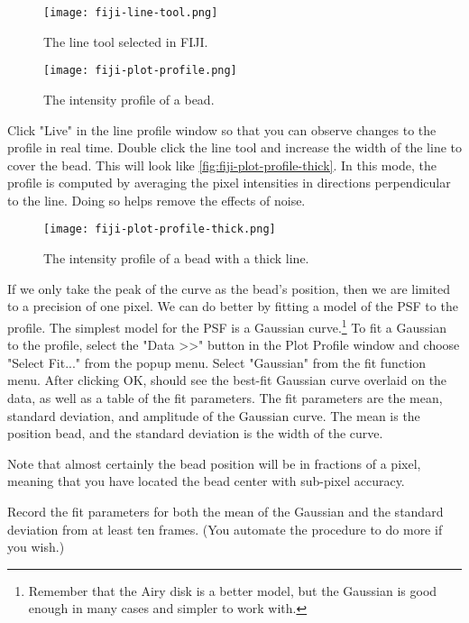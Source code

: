 \documentclass[10pt,a4paper,oneside]{book}
\begin{document}
\begin{figure}[ht]
    \centering
    \texttt{[image: fiji-line-tool.png]}
    \caption{The line tool selected in FIJI.}
    \label{fig:fiji-line-tool}
\end{figure}

\begin{figure}[ht]
    \centering
    \texttt{[image: fiji-plot-profile.png]}
    \caption{The intensity profile of a bead.}
    \label{fig:fiji-plot-profile}
\end{figure}

Click "Live" in the line profile window so that you can observe changes to the profile in real time. Double click the line tool and increase the width of the line to cover the bead. This will look like \autoref{fig:fiji-plot-profile-thick}. In this mode, the profile is computed by averaging the pixel intensities in directions perpendicular to the line. Doing so helps remove the effects of noise.

\begin{figure}[ht]
    \centering
    \texttt{[image: fiji-plot-profile-thick.png]}
    \caption{The intensity profile of a bead with a thick line.}
    \label{fig:fiji-plot-profile-thick}
\end{figure}

If we only take the peak of the curve as the bead's position, then we are limited to a precision of one pixel. We can do better by fitting a model of the PSF to the profile. The simplest model for the PSF is a Gaussian curve.\footnote{Remember that the Airy disk is a better model, but the Gaussian is good enough in many cases and simpler to work with.} To fit a Gaussian to the profile, select the "Data \textgreater \textgreater" button in the Plot Profile window and choose "Select Fit..." from the popup menu. Select "Gaussian" from the fit function menu. After clicking OK, should see the best-fit Gaussian curve overlaid on the data, as well as a table of the fit parameters. The fit parameters are the mean, standard deviation, and amplitude of the Gaussian curve. The mean is the position bead, and the standard deviation is the width of the curve.

Note that almost certainly the bead position will be in fractions of a pixel, meaning that you have located the bead center with sub-pixel accuracy.

Record the fit parameters for both the mean of the Gaussian and the standard deviation from at least ten frames. (You automate the procedure to do more if you wish.)
\end{document}

